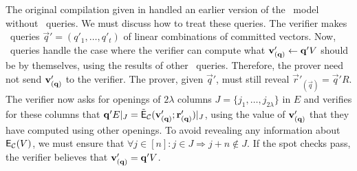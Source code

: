 The original compilation given in \cite{BootleCGGHJ17} handled an earlier version of the \ILC\ model without \ILCcheck\ queries. We must discuss how to treat these queries. The verifier makes \ILCcheck\ queries $\vec{q}'=(q'_1,\ldots,q'_t)$ of linear combinations of committed vectors. Now, \ILCcheck\ queries handle the case where the verifier can compute what ${\mathbf{v}}'_{(\mathbf{q})}\gets \mathbf{q}' V$ should be by themselves, using the results of other \ILCopen\ queries. Therefore, the prover need not send ${\mathbf{v}}'_{(\mathbf{q})}$ to the verifier. The prover, given $\vec{q}'$, must still reveal $\vec{r}'_{(\vec{q})}=\vec{q}'R$. The verifier now asks for openings of $2\lambda$ columns $J=\{j_1,\dots,j_{2\lambda}\}$ in $E$ and verifies for these columns that $\mathbf{q}'E|_J=\tilde{\mathsf{E}}_{\mathcal{C}}({\mathbf{v}}'_{(\mathbf{q})};\mathbf{r}'_{(\mathbf{q})})|_J$, using the value of ${\mathbf{v}}'_{(\mathbf{q})}$ that they have computed using other openings. To avoid revealing any information about $\mathsf{E}_{\mathcal{C}}(V)$, we must ensure that $\forall j\in [n]: j\in J\Rightarrow j+n\notin J$. If the spot checks pass, the verifier believes that ${\mathbf{v}}'_{(\mathbf{q})}=\mathbf{q}'V$.

